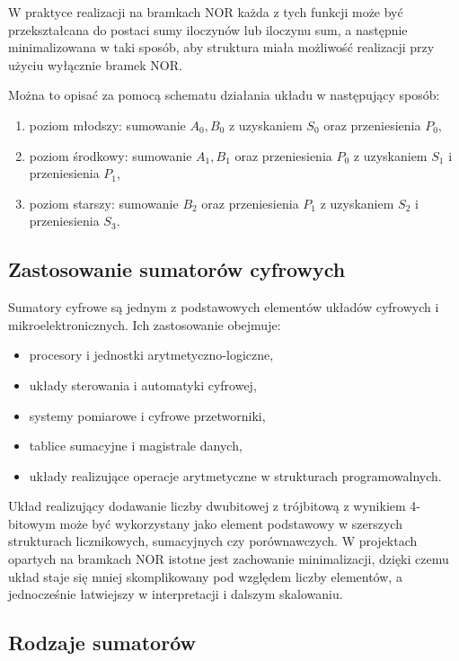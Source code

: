 \documentclass[11pt]{article}
\begin{document}
W praktyce realizacji na bramkach NOR każda z tych funkcji może być przekształcana do postaci sumy iloczynów lub iloczynu sum, a następnie minimalizowana w taki sposób, aby struktura miała możliwość realizacji przy użyciu wyłącznie bramek NOR.

Można to opisać za pomocą schematu działania układu w następujący sposób:
\begin{enumerate}
    \item poziom młodszy: sumowanie \(A_0, B_0\) z uzyskaniem \(S_0\) oraz przeniesienia \(P_0\),
    \item poziom środkowy: sumowanie \(A_1, B_1\) oraz przeniesienia \(P_0\) z uzyskaniem \(S_1\) i przeniesienia \(P_1\),
    \item poziom starszy: sumowanie \(B_2\) oraz przeniesienia \(P_1\) z uzyskaniem \(S_2\) i przeniesienia \(S_3\).
\end{enumerate}

\subsection{Zastosowanie sumatorów cyfrowych}

Sumatory cyfrowe są jednym z podstawowych elementów układów cyfrowych i mikroelektronicznych. Ich zastosowanie obejmuje:
\begin{itemize}
    \item procesory i jednostki arytmetyczno-logiczne,
    \item układy sterowania i automatyki cyfrowej,
    \item systemy pomiarowe i cyfrowe przetworniki,
    \item tablice sumacyjne i magistrale danych,
    \item układy realizujące operacje arytmetyczne w strukturach programowalnych.
\end{itemize}

Układ realizujący dodawanie liczby dwubitowej z trójbitową z wynikiem 4-bitowym może być wykorzystany jako element podstawowy w szerszych strukturach licznikowych, sumacyjnych czy porównawczych. W projektach opartych na bramkach NOR istotne jest zachowanie minimalizacji, dzięki czemu układ staje się mniej skomplikowany pod względem liczby elementów, a jednocześnie łatwiejszy w interpretacji i dalszym skalowaniu.

\subsection{Rodzaje sumatorów}
\end{document}
